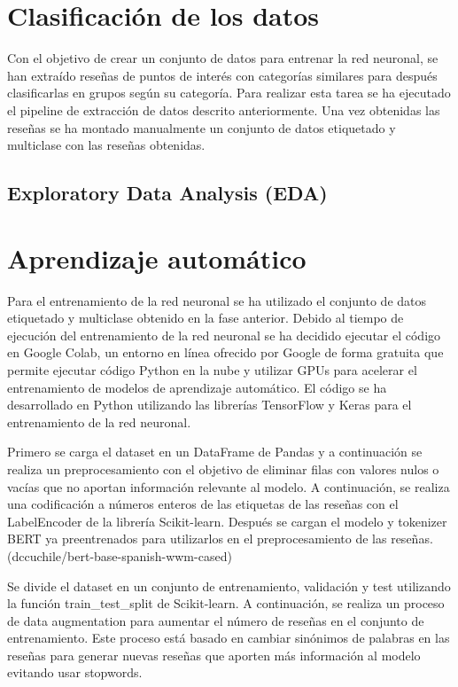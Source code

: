 \section{Clasificación de los datos}

Con el objetivo de crear un conjunto de datos para entrenar la red neuronal, se han extraído reseñas de puntos de interés con categorías similares 
para después clasificarlas en grupos según su categoría.
Para realizar esta tarea se ha ejecutado el pipeline de extracción de datos descrito anteriormente.
Una vez obtenidas las reseñas se ha montado manualmente un conjunto de datos etiquetado y multiclase con las reseñas obtenidas.

\subsection{Exploratory Data Analysis (EDA)}

\section{Aprendizaje automático}

Para el entrenamiento de la red neuronal se ha utilizado el conjunto de datos etiquetado y multiclase obtenido en la fase anterior.
Debido al tiempo de ejecución del entrenamiento de la red neuronal se ha decidido ejecutar el código en Google Colab, un entorno en línea
ofrecido por Google de forma gratuita que permite ejecutar código Python en la nube y utilizar GPUs para acelerar el entrenamiento de modelos de aprendizaje automático.
El código se ha desarrollado en Python utilizando las librerías TensorFlow y Keras para el entrenamiento de la red neuronal.

Primero se carga el dataset en un DataFrame de Pandas y a continuación se realiza un preprocesamiento con el objetivo de eliminar filas con valores nulos o vacías que no aportan información relevante al modelo.
A continuación, se realiza una codificación a números enteros de las etiquetas de las reseñas con el LabelEncoder de la librería Scikit-learn.
Después se cargan el modelo y tokenizer BERT ya preentrenados para utilizarlos en el preprocesamiento de las reseñas. (dccuchile/bert-base-spanish-wwm-cased)

Se divide el dataset en un conjunto de entrenamiento, validación y test utilizando la función train\_test\_split de Scikit-learn.
A continuación, se realiza un proceso de data augmentation para aumentar el número de reseñas en el conjunto de entrenamiento.
Este proceso está basado en cambiar sinónimos de palabras en las reseñas para generar nuevas reseñas que aporten más información al modelo evitando usar stopwords.

